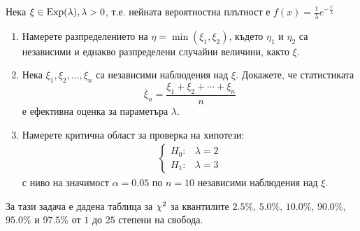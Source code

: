 \documentclass[
  headings=standardclasses,
  bibliography=totocnumbered,
]{scrartcl}
\begin{document}
\begin{exercise}\label{ex:se_summer2011}
  Нека \( \xi \in \operatorname{Exp}(\lambda), \lambda > 0 \), т.е. нейната вероятностна плътност е \( f(x) = \frac 1 \lambda e^{-\frac x \lambda} \)
  \begin{enumerate}[label=\alph*)]
    \item Намерете разпределението на \( \eta = \min(\xi_1, \xi_2) \), където \( \eta_1 \) и \( \eta_2 \) са независими и еднакво разпределени случайни величини, както \( \xi \).

    \item Нека \( \xi_1, \xi_2, \ldots, \xi_n \) са независими наблюдения над \( \xi \). Докажете, че статистиката
    \begin{equation*}
      \overline \xi_n = \frac {\xi_1 + \xi_2 + \cdots + \xi_n} n
    \end{equation*}
    е ефективна оценка за параметъра \( \lambda \).

    \item Намерете критична област за проверка на хипотези:
    \begin{align*}
      \begin{cases}
        H_0: &\lambda = 2 \\
        H_1: &\lambda = 3
      \end{cases}
    \end{align*}
    с ниво на значимост \( \alpha = 0.05 \) по \( n = 10 \) независими наблюдения над \( \xi \).
  \end{enumerate}
\end{exercise}

\begin{remark}
  За тази задача е дадена таблица за \( \chi^2 \) за квантилите \( 2.5\% \), \( 5.0\% \), \( 10.0\% \), \( 90.0\% \), \( 95.0\% \) и \( 97.5\% \) от \( 1 \) до \( 25 \) степени на свобода.
\end{remark}
\end{document}
